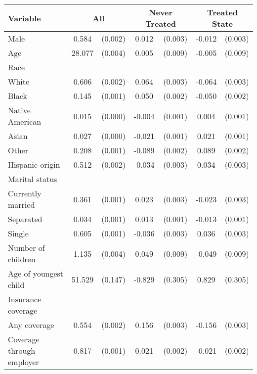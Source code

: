 \begin{tabular}{lcccccc}
\toprule
\toprule
 Variable & \multicolumn{2}{c}{All} & \multicolumn{2}{c}{Never Treated} & \multicolumn{2}{c}{Treated State} \\
\midrule 
 Male  & 0.584 & (0.002)  & 0.012 & (0.003)  & -0.012 & (0.003)  \\
 Age  & 28.077 & (0.004)  & 0.005 & (0.009)  & -0.005 & (0.009)  \\
 Race  & & &  \\
 \hspace{0.3cm}  White  & 0.606 & (0.002)  & 0.064 & (0.003)  & -0.064 & (0.003)  \\
 \hspace{0.3cm}  Black  & 0.145 & (0.001)  & 0.050 & (0.002)  & -0.050 & (0.002)  \\
 \hspace{0.3cm}  Native American  & 0.015 & (0.000)  & -0.004 & (0.001)  & 0.004 & (0.001)  \\
 \hspace{0.3cm}  Asian  & 0.027 & (0.000)  & -0.021 & (0.001)  & 0.021 & (0.001)  \\
 \hspace{0.3cm}  Other  & 0.208 & (0.001)  & -0.089 & (0.002)  & 0.089 & (0.002)  \\
 Hispanic origin  & 0.512 & (0.002)  & -0.034 & (0.003)  & 0.034 & (0.003)  \\
 Marital status  & & &  \\
 \hspace{0.3cm} Currently married  & 0.361 & (0.001)  & 0.023 & (0.003)  & -0.023 & (0.003)  \\
 \hspace{0.3cm} Separated  & 0.034 & (0.001)  & 0.013 & (0.001)  & -0.013 & (0.001)  \\
 \hspace{0.3cm} Single  & 0.605 & (0.001)  & -0.036 & (0.003)  & 0.036 & (0.003)  \\
 Number of children  & 1.135 & (0.004)  & 0.049 & (0.009)  & -0.049 & (0.009)  \\
 Age of youngest child  & 51.529 & (0.147)  & -0.829 & (0.305)  & 0.829 & (0.305)  \\
 Insurance coverage  & & &  \\
 \hspace{0.3cm}  Any coverage  & 0.554 & (0.002)  & 0.156 & (0.003)  & -0.156 & (0.003)  \\
 \hspace{0.3cm}  Coverage through employer  & 0.817 & (0.001)  & 0.021 & (0.002)  & -0.021 & (0.002)  \\

\end{tabular}
